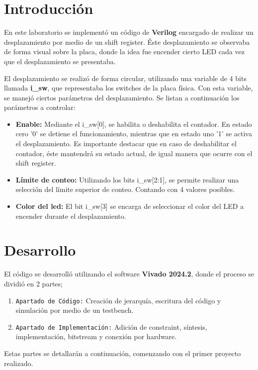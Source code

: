 \documentclass[12pt, a4paper]{article}
\begin{document}

\section{Introducción}
En este laboratorio se implementó un código de \textbf{Verilog} encargado de realizar un desplazamiento por medio de un shift register. Éste desplazamiento se observaba de forma visual sobre la placa,
donde la idea fue encender cierto LED cada vez que el desplazamiento se presentaba.

El desplazamiento se realizó de forma circular, utilizando una variable de 4 bits llamada \textbf{i\_sw}, que representaba los switches de la placa física. Con esta variable, se manejó ciertos parámetros del
desplazamiento. Se listan a continuación los parámetros a controlar:
    \begin{itemize}
        \item \textbf{Enable:} Mediante el i\_sw[0], se habilita o deshabilita el contador. En estado cero '0' se detiene el funcionamiento, mientras que en estado uno
        '1' se activa el desplazamiento. Es importante destacar que en caso de deshabilitar el contador, éste mantendrá su estado actual, de igual manera que ocurre con el shift register.
        \item \textbf{Límite de conteo:} Utilizando los bits i\_sw[2:1], se permite realizar una selección del límite superior de conteo. Contando con 4 valores posibles.
        \item \textbf{Color del led:} El bit i\_sw[3] se encarga de seleccionar el color del LED a encender durante el desplazamiento.
    \end{itemize}
\newpage

\section{Desarrollo}
El código se desarrolló utilizando el software \textbf{Vivado 2024.2}, donde el proceso se dividió en 2 partes;
\begin{enumerate}
    \item \texttt{Apartado de Código:} Creación de jerarquía, escritura del código y simulación por medio de un testbench.
    \item \texttt{Apartado de Implementación:} Adición de constraint, síntesis, implementación, bitstream y conexión por hardware.
\end{enumerate}
Estas partes se detallarán a continuación, comenzando con el primer proyecto realizado.
\end{document}
